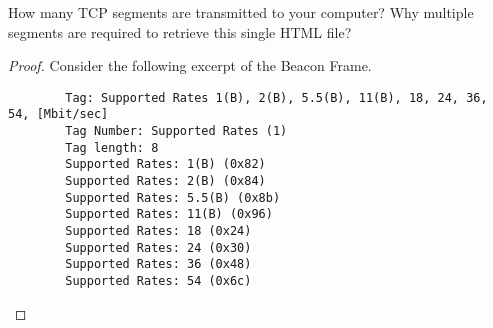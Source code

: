 \documentclass[../../main.tex]{subfiles}
\begin{document}
\begin{wts}
How many TCP segments are transmitted to your computer? Why multiple segments are required to retrieve this single HTML file? 
\end{wts}
\begin{proof}
Consider the following excerpt of the Beacon Frame.
    \begin{lstlisting}
        Tag: Supported Rates 1(B), 2(B), 5.5(B), 11(B), 18, 24, 36, 54, [Mbit/sec]
        Tag Number: Supported Rates (1)
        Tag length: 8
        Supported Rates: 1(B) (0x82)
        Supported Rates: 2(B) (0x84)
        Supported Rates: 5.5(B) (0x8b)
        Supported Rates: 11(B) (0x96)
        Supported Rates: 18 (0x24)
        Supported Rates: 24 (0x30)
        Supported Rates: 36 (0x48)
        Supported Rates: 54 (0x6c)\end{lstlisting}
\end{proof}
\end{document}
